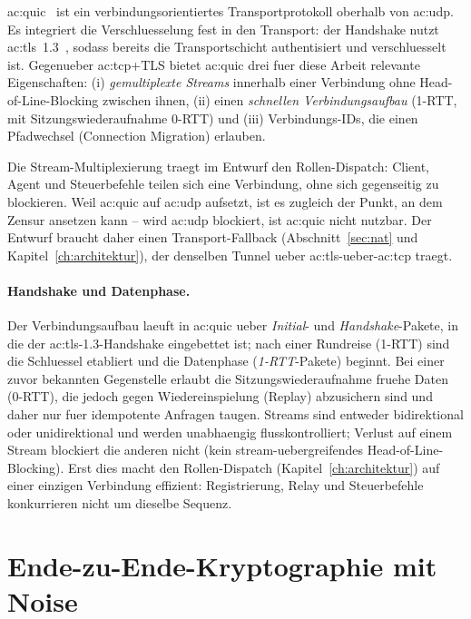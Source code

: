 \gls{ac:quic}~\cite{rfc9000} ist ein verbindungsorientiertes Transportprotokoll
oberhalb von \gls{ac:udp}. Es integriert die Verschluesselung fest in den
Transport: der Handshake nutzt \gls{ac:tls}~1.3~\cite{rfc8446,rfc9001}, sodass
bereits die Transportschicht authentisiert und verschluesselt ist. Gegenueber
\gls{ac:tcp}+TLS bietet \gls{ac:quic} drei fuer diese Arbeit relevante
Eigenschaften: (i) \emph{gemultiplexte Streams} innerhalb einer Verbindung ohne
Head-of-Line-Blocking zwischen ihnen, (ii) einen \emph{schnellen
Verbindungsaufbau} (1-RTT, mit Sitzungswiederaufnahme 0-RTT) und (iii)
Verbindungs-IDs, die einen Pfadwechsel (Connection Migration) erlauben.

Die Stream-Multiplexierung traegt im Entwurf den Rollen-Dispatch: Client, Agent
und Steuerbefehle teilen sich eine Verbindung, ohne sich gegenseitig zu
blockieren. Weil \gls{ac:quic} auf \gls{ac:udp} aufsetzt, ist es zugleich der
Punkt, an dem Zensur ansetzen kann -- wird \gls{ac:udp} blockiert, ist
\gls{ac:quic} nicht nutzbar. Der Entwurf braucht daher einen Transport-Fallback
(Abschnitt~\ref{sec:nat} und Kapitel~\ref{ch:architektur}), der denselben Tunnel
ueber \gls{ac:tls}-ueber-\gls{ac:tcp} traegt.

\paragraph{Handshake und Datenphase.} Der Verbindungsaufbau laeuft in
\gls{ac:quic} ueber \emph{Initial}- und \emph{Handshake}-Pakete, in die der
\gls{ac:tls}-1.3-Handshake eingebettet ist; nach einer Rundreise (1-RTT) sind die
Schluessel etabliert und die Datenphase (\emph{1-RTT}-Pakete) beginnt. Bei einer
zuvor bekannten Gegenstelle erlaubt die Sitzungswiederaufnahme fruehe Daten
(0-RTT), die jedoch gegen Wiedereinspielung (Replay) abzusichern sind und daher
nur fuer idempotente Anfragen taugen. Streams sind entweder bidirektional oder
unidirektional und werden unabhaengig flusskontrolliert; Verlust auf einem Stream
blockiert die anderen nicht (kein stream-uebergreifendes Head-of-Line-Blocking).
Erst dies macht den Rollen-Dispatch (Kapitel~\ref{ch:architektur}) auf einer
einzigen Verbindung effizient: Registrierung, Relay und Steuerbefehle konkurrieren
nicht um dieselbe Sequenz.

\section{Ende-zu-Ende-Kryptographie mit Noise}
\label{sec:noise}

